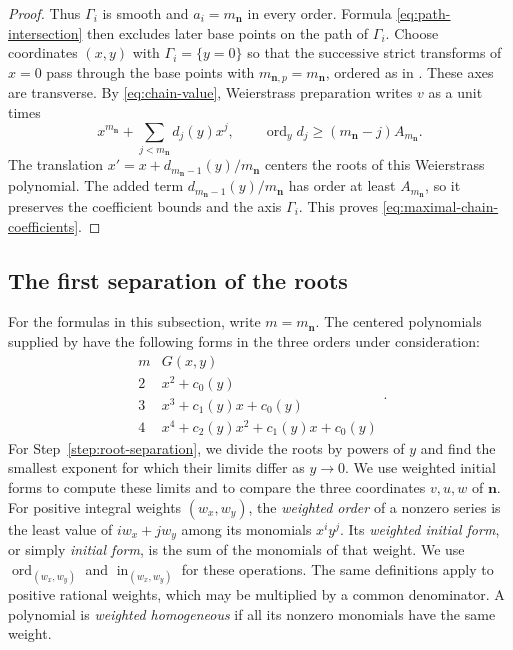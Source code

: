 \documentclass[11pt,letterpaper]{article}
\numberwithin{equation}{section}
\theoremstyle{remark}
\theoremstyle{plain}
\newcommand{\ord}{\operatorname{ord}}
\begin{document}
\begin{proof}
Thus $\Gamma_i$ is smooth and $a_i=m_{\boldsymbol n}$ in every
order.  Formula \eqref{eq:path-intersection} then excludes later
base points on the path of $\Gamma_i$.
Choose coordinates $(x,y)$ with $\Gamma_i=\{y=0\}$ so that the
successive strict transforms of $x=0$ pass through the base points
with $m_{\boldsymbol n,p}=m_{\boldsymbol n}$, ordered as in
.  These axes are transverse.
By \eqref{eq:chain-value}, Weierstrass preparation
\cite[Theorem~I.1.6]{GreuelLossenShustin} writes $v$ as a unit times
\[
 x^{m_{\boldsymbol n}}+\sum_{j<m_{\boldsymbol n}}d_j(y)x^j,
 \qquad
 \ord_y d_j\geq(m_{\boldsymbol n}-j)A_{m_{\boldsymbol n}}.
\]
The translation $x'=x+d_{m_{\boldsymbol n}-1}(y)/m_{\boldsymbol n}$
centers the roots of this Weierstrass polynomial.  The added term
$d_{m_{\boldsymbol n}-1}(y)/m_{\boldsymbol n}$ has order at least
$A_{m_{\boldsymbol n}}$, so it preserves the coefficient bounds and
the axis $\Gamma_i$.  This proves \eqref{eq:maximal-chain-coefficients}.
\end{proof}

\subsection{The first separation of the roots}

For the formulas in this subsection, write $m=m_{\boldsymbol n}$.
The centered polynomials supplied by 
have the following forms in the three orders under consideration:
\[
 \begin{array}{c|c}
 m&G(x,y)\\ \hline
 2&x^2+c_0(y)\\
 3&x^3+c_1(y)x+c_0(y)\\
 4&x^4+c_2(y)x^2+c_1(y)x+c_0(y)
 \end{array}.
\]
For Step~\ref{step:root-separation}, we divide the roots by powers of
$y$ and find the smallest exponent for which their limits differ as
$y\to0$.  We use weighted initial forms to compute these limits and
to compare the three coordinates $v,u,w$ of $\boldsymbol n$.
For positive integral weights $(w_x,w_y)$, the \emph{weighted
order} of a nonzero series is the least value of $iw_x+jw_y$
among its monomials $x^iy^j$.  Its \emph{weighted initial form},
or simply \emph{initial form}, is the sum of the monomials of that
weight.  We use
$\operatorname{ord}_{(w_x,w_y)}$ and
$\operatorname{in}_{(w_x,w_y)}$ for these operations.  The same
definitions apply to positive rational weights, which may be multiplied
by a common denominator.
A polynomial is \emph{weighted homogeneous} if all its nonzero monomials
have the same weight.
\end{document}

